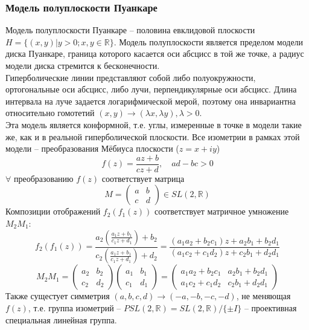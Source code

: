 \documentclass[12pt]{article}
\theoremstyle{definition}
\begin{document}
\subsubsection{Модель полуплоскости Пуанкаре}
Модель полуплоскости Пуанкаре -- половина евклидовой плоскости $H=\{(x,y)|y>0;x,y\in\mathbb{R}\}$. Модель полуплоскости является пределом модели диска Пуанкаре, граница которого касается оси абсцисс в той же точке, а радиус модели диска стремится к бесконечности.\\
Гиперболические линии представляют собой либо полуокружности, ортогональные оси абсцисс, либо лучи, перпендикулярные оси абсцисс. Длина интервала на луче задается логарифмической мерой, поэтому она инвариантна относительно гомотетий $(x,y)\rightarrow(\lambda x,\lambda y),\lambda>0$.\\
Эта модель является конформной, т.е. углы, измеренные в точке в модели такие же, как и в реальной гиперболической плоскости. Все изометрии в рамках этой модели -- преобразования Мёбиуса плоскости ($z=x+iy$)
\begin{equation}
    f(z)=\frac{az+b}{cz+d},\quad ad-bc>0
\end{equation}
$\forall$ преобразованию $f(z)$ соответствует матрица
\begin{equation}
    M=\begin{pmatrix}
        a & b\\
        c & d
    \end{pmatrix}\in SL(2,\mathbb{R})
\end{equation}
Композиции отображений $f_2(f_1(z))$ соответствует матричное умножение $M_2M_1$:
\begin{equation}
    f_2(f_1(z))=\frac{a_2(\frac{a_1z+b_1}{c_1z+d_1})+b_2}{c_2(\frac{a_1z+b_1}{c_1z+d_1})+d_2}=\frac{(a_1a_2+b_2c_1)z+a_2b_1+b_2d_1}{(a_1c_2+c_1d_2)z+c_2b_1+d_2d_1}
\end{equation}
\begin{equation}
    M_2M_1=\begin{pmatrix}
        a_2 & b_2\\
        c_2 & d_2
        \end{pmatrix}\begin{pmatrix}
        a_1 & b_1\\
        c_1 & d_1
    \end{pmatrix}=\begin{pmatrix}
        a_1a_2+b_2c_1 & a_2b_1+b_2d_1\\
        a_1c_2+c_1d_2 & c_2b_1+d_2d_1
    \end{pmatrix}
\end{equation}
Также сущестует симметрия $(a,b,c,d)\rightarrow(-a,-b,-c,-d)$, не меняющая $f(z)$, т.е. группа изометрий -- $PSL(2,\mathbb{R})=SL(2,\mathbb{R})/\{\pm I\}$ -- проективная специальная линейная группа.
\end{document}
